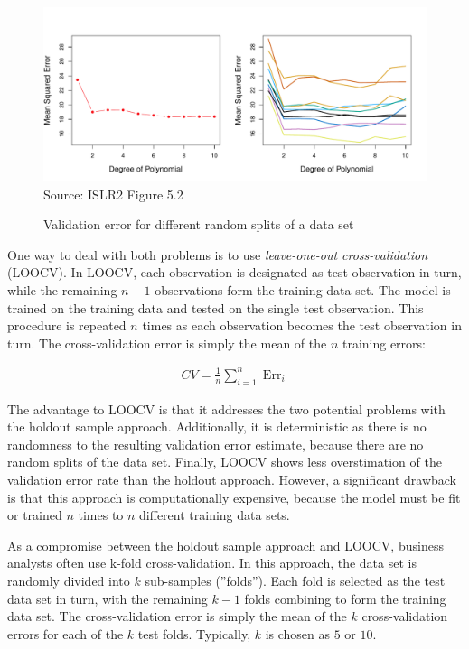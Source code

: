 \begin{figure}[b]
\centering 

\includegraphics[width=.9\textwidth]{Figures_Chapters_1-6/Chapter5/5_2.pdf}
\scriptsize Source: ISLR2 Figure 5.2
\caption{Validation error for different random splits of a data set}
\label{fig:holdout}
\end{figure}

One way to deal with both problems is to use \emph{leave-one-out cross-validation} (LOOCV). In LOOCV, each observation is designated as test observation in turn, while the remaining $n-1$ observations form the training data set. The model is trained on the training data and tested on the single test observation. This procedure is repeated $n$ times as each observation becomes the test observation in turn. The cross-validation error is simply the mean of the $n$ training errors:

\begin{align*}
CV = \frac{1}{n} \sum\nolimits_{i=1}^n \operatorname{Err}_i
\end{align*}

The advantage to LOOCV is that it addresses the two potential problems with the holdout sample approach. Additionally, it is deterministic as there is no randomness to the resulting validation error estimate, because there are no random splits of the data set. Finally, LOOCV shows less overstimation of the validation error rate than the holdout approach. However, a significant drawback is that this approach is computationally expensive, because the model must be fit or trained $n$ times to $n$ different training data sets. 

As a compromise between the holdout sample approach and LOOCV, business analysts often use k-fold cross-validation. In this approach, the data set is randomly divided into $k$ sub-samples (''folds''). Each fold is selected as the test data set in turn, with the remaining $k-1$ folds combining to form the training data set. The cross-validation error is simply the mean of the $k$ cross-validation errors for each of the $k$ test folds. Typically, $k$ is chosen as $5$ or $10$.

